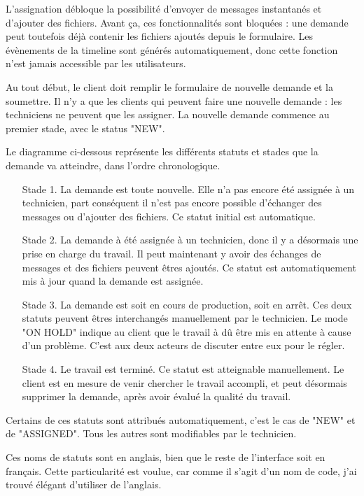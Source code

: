 \documentclass[
    iai, %
    eai, %
]{heig-tb}
\begin{document}
L'assignation débloque la possibilité d'envoyer de messages instantanés et d'ajouter des fichiers.
Avant ça, ces fonctionnalités sont bloquées : une demande peut toutefois déjà contenir les fichiers ajoutés depuis le formulaire.
Les évènements de la timeline sont générés automatiquement, donc cette fonction n'est jamais accessible par les utilisateurs.

Au tout début, le client doit remplir le formulaire de nouvelle demande et la soumettre.
Il n'y a que les clients qui peuvent faire une nouvelle demande : les techniciens ne peuvent que les assigner.
La nouvelle demande commence au premier stade, avec le status "NEW".
\newpage

Le diagramme ci-dessous représente les différents statuts et stades que la demande va atteindre, dans l'ordre chronologique.


\begin{enumerate}
  \item[Stade 1.] La demande est toute nouvelle. Elle n'a pas encore été assignée à un technicien, part conséquent il n'est pas encore possible d'échanger des messages ou d'ajouter des fichiers. Ce statut initial est automatique.
  \item[Stade 2.] La demande à été assignée à un technicien, donc il y a désormais une prise en charge du travail. Il peut maintenant y avoir des échanges de messages et des fichiers peuvent êtres ajoutés. Ce statut est automatiquement mis à jour quand la demande est assignée.
  \item[Stade 3.] La demande est soit en cours de production, soit en arrêt. Ces deux statuts peuvent êtres interchangés manuellement par le technicien. Le mode "ON HOLD" indique au client que le travail à dû être mis en attente à cause d'un problème. C'est aux deux acteurs de discuter entre eux pour le régler.
  \item[Stade 4.] Le travail est terminé. Ce statut est atteignable manuellement. Le client est en mesure de venir chercher le travail accompli, et peut désormais supprimer la demande, après avoir évalué la qualité du travail.
\end{enumerate}
\bigskip
Certains de ces statuts sont attribués automatiquement, c'est le cas de "NEW" et de "ASSIGNED".
Tous les autres sont modifiables par le technicien.

Ces noms de statuts sont en anglais, bien que le reste de l'interface soit en français.
Cette particularité est voulue, car comme il s'agit d'un nom de code, j'ai trouvé élégant d'utiliser de l'anglais.
\end{document}
